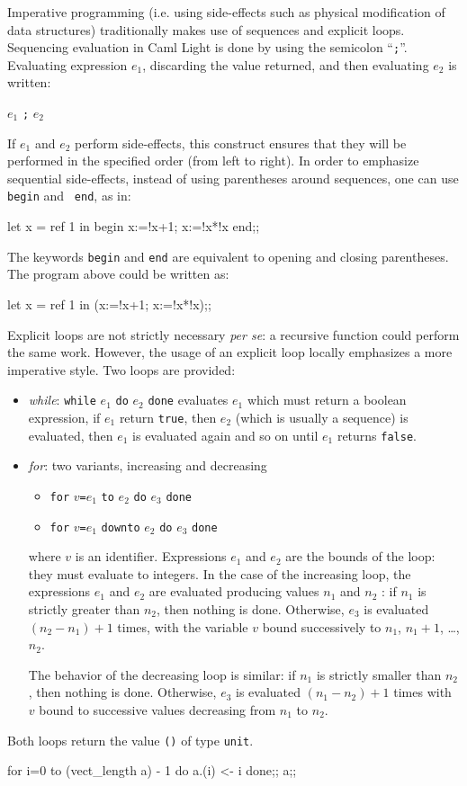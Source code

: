 Imperative programming (i.e. using side-effects such as physical
modification of data structures) traditionally makes use of sequences
and explicit loops. Sequencing evaluation in Caml Light is done by
using the semicolon ``\verb";"''. Evaluating expression $e_1$,
discarding the value returned, and then evaluating $e_2$ is written:
\begin{center}
$e_1$ {\tt ;} $e_2$
\end{center}
If $e_1$ and $e_2$ perform side-effects, this construct ensures
that they will be performed in the specified order (from left to
right). In order to emphasize sequential side-effects, instead of
using parentheses around sequences, one can use {\tt begin} and {\tt
end}, as in:
\begin{caml_example}
let x = ref 1 in
  begin
     x:=!x+1;
     x:=!x*!x
  end;;
\end{caml_example}
The keywords {\tt begin} and {\tt end} are equivalent to opening and
closing parentheses. The program above could be written as:
\begin{caml_example}
let x = ref 1 in
  (x:=!x+1; x:=!x*!x);;
\end{caml_example}

Explicit loops are not strictly necessary {\em per se}: a recursive
function could perform the same work. However, the usage of an
explicit loop locally emphasizes a more imperative style. Two loops
are provided:
\begin{itemize}
\item {\it while}: {\tt while} $e_1$ {\tt do} $e_2$ {\tt done}
evaluates $e_1$ which must return a boolean expression, if $e_1$
return {\tt true}, then $e_2$ (which is usually a sequence) is
evaluated, then $e_1$ is evaluated again and so on until $e_1$
returns {\tt false}.

\item{\it for}: two variants, increasing and decreasing
\begin{itemize}
\item {\tt for} $v$\verb|=|$e_1$ {\tt to} $e_2$ {\tt do} $e_3$ {\tt done}
\item {\tt for} $v$\verb|=|$e_1$ {\tt downto} $e_2$ {\tt do} $e_3$ {\tt done}
\end{itemize}
where $v$ is an identifier. Expressions $e_1$ and $e_2$ are the bounds
of the loop: they must evaluate to integers. In the case of the
increasing loop, the expressions $e_1$ and $e_2$ are evaluated
producing values $n_1$ and $n_2$ : if $n_1$ is strictly greater than
$n_2$, then nothing is done.  Otherwise, $e_3$ is evaluated $(n_2 -
n_1)+1$ times, with the variable $v$ bound successively to $n_1$, $n_1
+1$, \ldots, $n_2$.

The behavior of the decreasing loop is similar: if $n_1$ is strictly
smaller than $n_2$, then nothing is done. Otherwise, $e_3$ is
evaluated $(n_1 - n_2)+1$ times with $v$ bound to successive values
decreasing from $n_1$ to $n_2$.
\end{itemize}
Both loops return the value \verb|()| of type {\tt unit}.
\begin{caml_example}
for i=0 to (vect_length a) - 1 do a.(i) <- i done;;
a;;
\end{caml_example}

